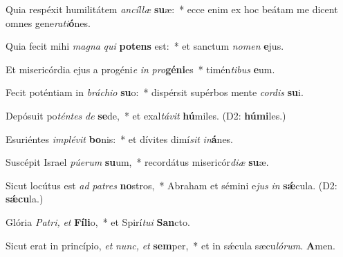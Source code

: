 \item Quia respéxit humilitátem \textit{ancíllæ} \textbf{su}æ:~* ecce enim ex hoc beátam me dicent omnes gene\textit{rati}\textbf{ó}nes.
\item Quia fecit mihi \textit{magna} \textit{qui} \textbf{pot}\textbf{ens} est:~* et sanctum \textit{nomen} \textbf{e}jus.
\item Et misericórdia ejus a progéni\textit{e} \textit{in} \textit{pro}\textbf{gé}\textbf{ni}es~* timén\textit{tibus} \textbf{e}um.
\item Fecit poténtiam in \textit{bráchio} \textbf{su}o:~* dispérsit supérbos mente \textit{cordis} \textbf{su}i.
\item Depósuit po\textit{téntes} \textit{de} \textbf{se}de,~* et exal\textit{távit} \textbf{hú}miles.  (D2: \textbf{húmi}les.)
\item Esuriéntes \textit{implévit} \textbf{bo}nis:~* et dívites dimí\myhspace\textit{sit} \textit{in}\textbf{á}nes.
\item Suscépit Israel \textit{púerum} \textbf{su}um,~* recordátus misericór\textit{diæ} \textbf{su}æ.
\item Sicut locútus est \textit{ad} \textit{pa}\textit{tres} \textbf{no}stros,~* Abraham et sémini e\hspace*{0.02em}\textit{jus} \textit{in} \textbf{sǽ}cula. (D2: \textbf{sǽcu}la.)
\item Glória \textit{Pa}\textit{tri,} \textit{et} \textbf{Fí}\textbf{li}o,~* et Spirí\tinyhspace\textit{tui} \textbf{San}cto.
\item Sicut erat in princípio, \textit{et} \textit{nunc,} \textit{et} \textbf{sem}per,~* et in sǽcula sæcu\tinyhspace\textit{lórum.} \textbf{A}men.

